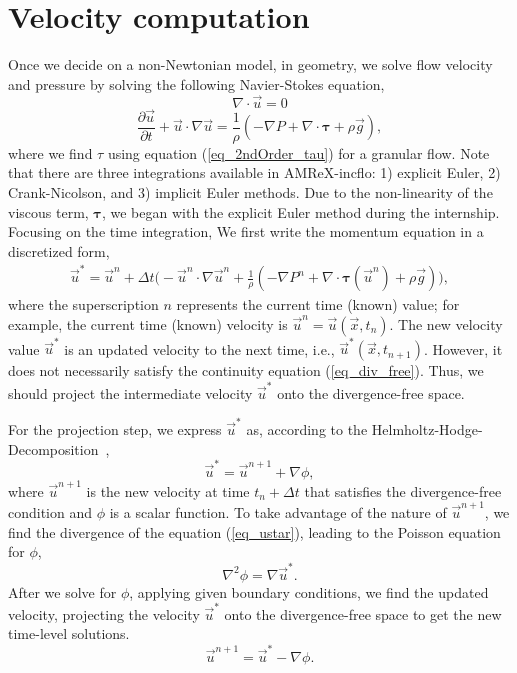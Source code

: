 \section{Velocity computation}
Once we decide on a non-Newtonian model, in geometry, we solve flow velocity and pressure by solving the following Navier-Stokes equation,
\begin{equation}
  \nabla \cdot \vec{u} = 0 
  \label{eq_div_free} 
\end{equation}
\begin{equation}
     \frac{\partial \vec{u}}{\partial t} + \vec{u}\cdot \nabla \vec{u}
= \frac{1}{\rho}
\left(
- \nabla P 
    + \nabla \cdot   \bm{\tau} 
    +  \rho  \vec{g} 
    \right),
  \label{eq_NS_ch4}
  \end{equation}
where we find $\tau$ using equation (\ref{eq_2ndOrder_tau}) for a granular flow. 
Note that there are three integrations available in AMReX-incflo: 1) explicit Euler, 2) Crank-Nicolson, and 3) implicit Euler methods. 
Due to the non-linearity of the viscous term, $\bm{\tau}$, we began with the explicit Euler method during the internship. 
Focusing on the time integration, We first write the momentum equation in a discretized form, 
\begin{align}
    \vec{u}^*
= 
 \vec{u}^n + 
{\Delta t} 
\biggl(
-\vec{u}^n \cdot \nabla \vec{u}^n 
+\frac{1}{\rho}
\left(
- \nabla P^n 
    + \nabla \cdot   \bm{\tau}(\vec{u}^n)
    +  \rho  \vec{g} 
    \right)
    \biggr),
  \end{align}
where the superscription $n$ represents the current time (known) value; for example, the current time (known) velocity is $\vec{u}^n = \vec{u}(\vec{x}, t_n)$. The new velocity value $\vec{u}^*$ is an updated velocity to the next time, i.e., $\vec{u}^* (\vec{x}, t_{n+1})$. However, it does not necessarily satisfy the continuity equation (\ref{eq_div_free}). Thus, we should project the intermediate velocity $\vec{u}^*$ onto the divergence-free space. 
\par
For the projection step, we express $\vec{u}^{*}$ as, according to the Helmholtz-Hodge-Decomposition~\cite{chorin_mathematical_1993}, 
\begin{equation}
  \vec{u}^* = \vec{u}^{n+1} + \nabla \phi,
  \label{eq_ustar}
\end{equation}
where $\vec{u}^{n+1}$ is the new velocity at time $t_n + \Delta t$ that satisfies the divergence-free condition and $\phi$ is a scalar function.
To take advantage of the nature of $\vec{u}^{n+1}$, we find the divergence of the equation (\ref{eq_ustar}), leading to the Poisson equation for $\phi$,
\[
  \nabla^2 \phi = \nabla \vec{u}^*.  
\]
After we solve for $\phi$, applying given boundary conditions, we find the updated velocity, projecting the velocity $\vec{u}^*$ onto the divergence-free space to get the new time-level solutions.
\[
  \vec{u}^{n+1} = \vec{u}^* - \nabla \phi.
\]

